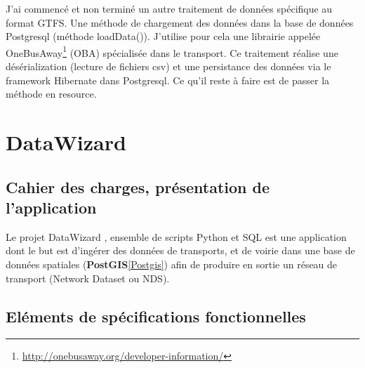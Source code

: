 \begin{itemize}
J'ai commencé et non terminé un autre traitement de données spécifique au format GTFS. Une méthode de chargement des données dans la base de données Postgresql (méthode loadData()). J'utilise pour cela une librairie appelée OneBusAway\footnote{\url{http://onebusaway.org/developer-information/}} (OBA) spécialisée dans le transport. Ce traitement réalise une désérialization (lecture de fichiers csv) et une persistance des données via le framework Hibernate dans Postgresql. Ce qu'il reste à faire est de passer la méthode en resource.





\pagebreak

\section{DataWizard}\label{DataWizard}

\subsection{Cahier des charges, présentation de l'application}

Le projet \og DataWizard \fg, ensemble de scripts Python et SQL est une application dont le but est d'ingérer des données de transports, et de voirie dans une base de données spatiales (\textbf{PostGIS}\ref{Postgis}) afin de produire en sortie un réseau de transport (Network Dataset ou NDS).\\


\subsection{Eléments de spécifications fonctionnelles}


\end{itemize}
